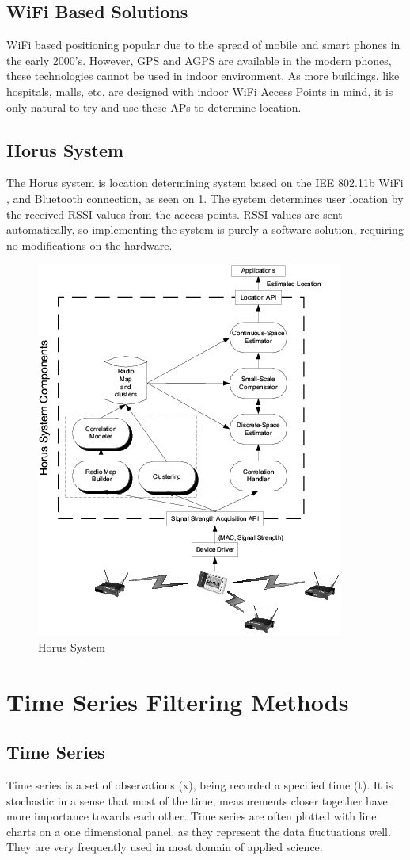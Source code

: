 \subsection{WiFi Based Solutions}
WiFi \cite{chen2002signal} based positioning popular due to the spread of mobile and smart phones in the early 2000's. However, GPS and AGPS are available in the modern phones, these technologies cannot be used in indoor environment. As more buildings, like hospitals, malls, etc. are designed with indoor WiFi Access Points in mind, it is only natural to try and use these APs to determine location.
\subsection{Horus System}
The Horus \cite{youssef2005horus} system is location determining system based on the IEE 802.11b WiFi , and Bluetooth connection, as seen on \ref{fig:horusimage}. The system determines user location by the received RSSI values from the access points. RSSI values are sent automatically, so implementing the system is purely a software solution, requiring no modifications on the hardware.
\begin{figure}[!h]
	\centering
		\includegraphics[width=.55\linewidth]{figures/Horus.png}
		\caption{Horus System \cite{HORUS}}\label{fig:horusimage}
\end{figure}


\section{Time Series Filtering Methods}
\subsection{Time Series}
Time series \cite{kalman1960new,durbin2012time} is a set of observations (x), being recorded a specified time (t).
It is stochastic in a sense that most of the time, measurements closer together have more importance towards each other.
Time series are often plotted with line charts on a one dimensional panel, as they represent the data fluctuations well.
They are very frequently used in most domain of applied science.

